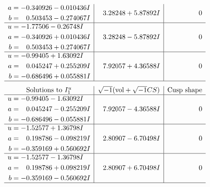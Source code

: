 \documentclass[1p]{elsarticle_modified}
\theoremstyle{definition}
\newcommand{\I}{\sqrt{-1}}
\begin{document}
$$\begin{array}{c|c|c}
\begin{aligned}
a &= -0.340926 - 0.010436 I \\
b &= \phantom{-}0.503453 - 0.274067 I\end{aligned}
 & \phantom{-}3.28248 + 5.87892 I & \phantom{-0.000000 } 0 \\ \hline\begin{aligned}
u &= -1.77506 - 0.26748 I \\
a &= -0.340926 + 0.010436 I \\
b &= \phantom{-}0.503453 + 0.274067 I\end{aligned}
 & \phantom{-}3.28248 - 5.87892 I & \phantom{-0.000000 } 0 \\ \hline\begin{aligned}
u &= -0.99405 + 1.63092 I \\
a &= \phantom{-}0.045247 + 0.255209 I \\
b &= -0.686496 + 0.055881 I\end{aligned}
 & \phantom{-}7.92057 + 4.36588 I & \phantom{-0.000000 } 0\\
 \hline 
 \end{array}$$\newpage$$\begin{array}{c|c|c}  
\text{Solutions to }I^u_{1}& \I (\text{vol} + \sqrt{-1}CS) & \text{Cusp shape}\\
 \hline 
\begin{aligned}
u &= -0.99405 - 1.63092 I \\
a &= \phantom{-}0.045247 - 0.255209 I \\
b &= -0.686496 - 0.055881 I\end{aligned}
 & \phantom{-}7.92057 - 4.36588 I & \phantom{-0.000000 } 0 \\ \hline\begin{aligned}
u &= -1.52577 + 1.36798 I \\
a &= \phantom{-}0.198786 - 0.098219 I \\
b &= -0.359169 + 0.560692 I\end{aligned}
 & \phantom{-}2.80907 - 6.70498 I & \phantom{-0.000000 } 0 \\ \hline\begin{aligned}
u &= -1.52577 - 1.36798 I \\
a &= \phantom{-}0.198786 + 0.098219 I \\
b &= -0.359169 - 0.560692 I\end{aligned}
 & \phantom{-}2.80907 + 6.70498 I & \phantom{-0.000000 } 0\\
 \hline 
 \end{array}$$\newpage\newpage\renewcommand{\arraystretch}{1}
\end{document}
